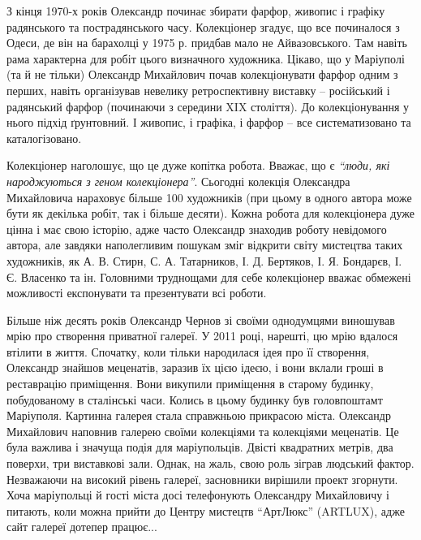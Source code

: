
З кінця 1970-х років Олександр починає збирати фарфор, живопис і графіку
радянського та пострадянського часу. Колекціонер згадує, що все починалося з
Одеси, де він на барахолці у 1975 р. придбав мало не Айвазовського. Там навіть
рама характерна для робіт цього визначного художника. Цікаво, що у Маріуполі
(та й не тільки) Олександр Михайлович почав колекціонувати фарфор одним з
перших, навіть організував невелику ретроспективну виставку – російський і
радянський фарфор (починаючи з середини XIX століття). До колекціонування у
нього підхід ґрунтовний. І живопис, і графіка, і фарфор – все систематизовано
та каталогізовано. 


Колекціонер наголошує, що це дуже копітка робота. Вважає, що
є \emph{\enquote{люди, які народжуються з геном колекціонера}}. Сьогодні колекція Олександра
Михайловича нараховує більше 100 художників (при цьому в одного автора може
бути як декілька робіт, так і більше десяти). Кожна робота для колекціонера
дуже цінна і має свою історію, адже часто Олександр знаходив роботу невідомого
автора, але завдяки наполегливим пошукам зміг відкрити світу мистецтва таких
художників, як А. В. Стирн, С. А. Татарников, І. Д. Бертяков, І. Я. Бондарєв, І. Є.
Власенко та ін. Головними труднощами для себе колекціонер вважає обмежені
можливості експонувати та презентувати всі роботи.

Більше ніж десять років Олександр Чернов зі своїми однодумцями виношував мрію
про створення приватної галереї. У 2011 році, нарешті, цю мрію вдалося втілити
в життя. Спочатку, коли тільки народилася ідея про її створення, Олександр
знайшов меценатів, заразив їх цією ідеєю, і вони вклали гроші в реставрацію
приміщення. Вони викупили приміщення в старому будинку, побудованому в
сталінські часи. Колись в цьому будинку був головпоштамт Маріуполя. Картинна
галерея стала справжньою прикрасою міста. Олександр Михайлович наповнив галерею
своїми колекціями та колекціями меценатів. Це була важлива і значуща подія для
маріупольців. Двісті квадратних метрів, два поверхи, три виставкові зали.
Однак, на жаль, свою роль зіграв людський фактор. Незважаючи на високий рівень
галереї, засновники вирішили проект згорнути. Хоча маріупольці й гості міста
досі телефонують Олександру Михайловичу і питають, коли можна прийти до Центру
мистецтв \enquote{АртЛюкс} (ARTLUX), адже сайт галереї дотепер працює...


